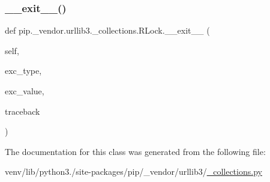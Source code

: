 \mbox{\label{classpip_1_1__vendor_1_1urllib3_1_1__collections_1_1RLock_a76a714bc36425739430aa7786f66fbbe}} 
\subsubsection{\texorpdfstring{\+\_\+\+\_\+exit\+\_\+\+\_\+()}{\_\_exit\_\_()}}
{\footnotesize\ttfamily def pip.\+\_\+vendor.\+urllib3.\+\_\+collections.\+R\+Lock.\+\_\+\+\_\+exit\+\_\+\+\_\+ (\begin{DoxyParamCaption}\item[{}]{self,  }\item[{}]{exc\+\_\+type,  }\item[{}]{exc\+\_\+value,  }\item[{}]{traceback }\end{DoxyParamCaption})}



The documentation for this class was generated from the following file\+:\begin{DoxyCompactItemize}
\item 
venv/lib/python3./site-\/packages/pip/\+\_\+vendor/urllib3/\hyperlink{__collections_8py}{\+\_\+collections.\+py}\end{DoxyCompactItemize}
